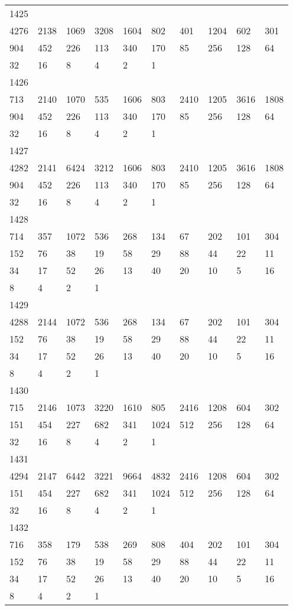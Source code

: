 \begin{longtable}{*{10}{l}}
1425&&&&&&&&&\\
4276& 2138& 1069& 3208& 1604& 802& 401& 1204& 602& 301\\
904& 452& 226& 113& 340& 170& 85& 256& 128& 64\\
32& 16& 8& 4& 2& 1& \\

1426&&&&&&&&&\\
713& 2140& 1070& 535& 1606& 803& 2410& 1205& 3616& 1808\\
904& 452& 226& 113& 340& 170& 85& 256& 128& 64\\
32& 16& 8& 4& 2& 1& \\

1427&&&&&&&&&\\
4282& 2141& 6424& 3212& 1606& 803& 2410& 1205& 3616& 1808\\
904& 452& 226& 113& 340& 170& 85& 256& 128& 64\\
32& 16& 8& 4& 2& 1& \\

1428&&&&&&&&&\\
714& 357& 1072& 536& 268& 134& 67& 202& 101& 304\\
152& 76& 38& 19& 58& 29& 88& 44& 22& 11\\
34& 17& 52& 26& 13& 40& 20& 10& 5& 16\\
8& 4& 2& 1& \\

1429&&&&&&&&&\\
4288& 2144& 1072& 536& 268& 134& 67& 202& 101& 304\\
152& 76& 38& 19& 58& 29& 88& 44& 22& 11\\
34& 17& 52& 26& 13& 40& 20& 10& 5& 16\\
8& 4& 2& 1& \\

1430&&&&&&&&&\\
715& 2146& 1073& 3220& 1610& 805& 2416& 1208& 604& 302\\
151& 454& 227& 682& 341& 1024& 512& 256& 128& 64\\
32& 16& 8& 4& 2& 1& \\

1431&&&&&&&&&\\
4294& 2147& 6442& 3221& 9664& 4832& 2416& 1208& 604& 302\\
151& 454& 227& 682& 341& 1024& 512& 256& 128& 64\\
32& 16& 8& 4& 2& 1& \\

1432&&&&&&&&&\\
716& 358& 179& 538& 269& 808& 404& 202& 101& 304\\
152& 76& 38& 19& 58& 29& 88& 44& 22& 11\\
34& 17& 52& 26& 13& 40& 20& 10& 5& 16\\
8& 4& 2& 1& \\


\end{longtable}

